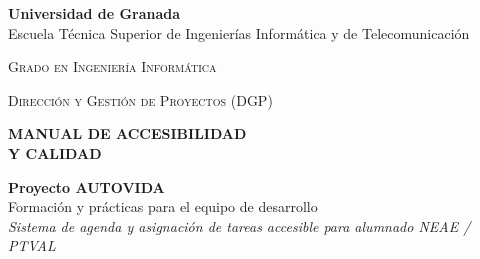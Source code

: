 \hypersetup{pageanchor=false}
\begin{titlepage}
  \AddToShipoutPicture*{\BackgroundPic}

  \begin{flushleft}
    \large\textsf{\textbf{Universidad de Granada}}\\[2pt]
    \large\textsf{Escuela Técnica Superior de Ingenierías Informática y de Telecomunicación}
    \vfill

    {\large\textsc{Grado en Ingeniería Informática}}
    \vfill

    {\large\textsc{Dirección y Gestión de Proyectos (DGP)}}
    \par{}
    \vfill

    {\Huge\bfseries\color{ugrDarkRed}
      MANUAL DE ACCESIBILIDAD\\Y CALIDAD}
    \vspace{8pt}

    {\LARGE\bfseries\color{textDark}Proyecto AUTOVIDA}\\[4pt]
    {\large\textsf{Formación y prácticas para el equipo de desarrollo}}\\[4pt]
    {\normalsize\itshape Sistema de agenda y asignación de tareas accesible para alumnado NEAE / PTVAL}

    \vfill


\end{flushleft}
\end{titlepage}
